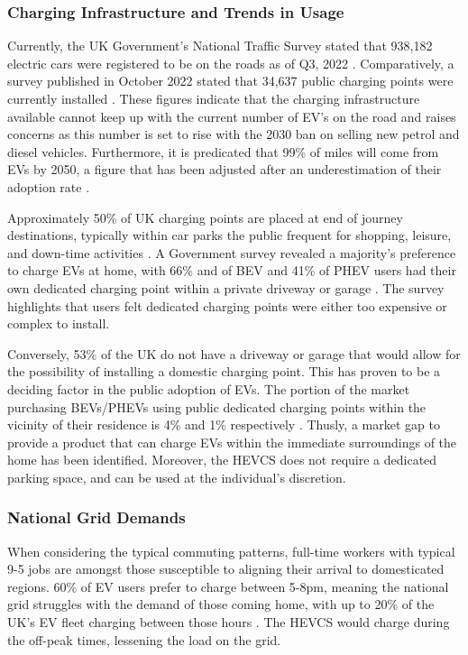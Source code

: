 \documentclass [12pt]{article}
\begin{document}
\subsubsection{Charging Infrastructure and Trends in Usage}

Currently, the UK Government’s National Traffic Survey stated that 938,182 electric cars were registered to be on the roads as of Q3, 2022 \cite{Q32022}. Comparatively, a survey published in October 2022 stated that 34,637 public charging points were currently installed \cite{chargestats}. These figures indicate that the charging infrastructure available cannot keep up with the current number of EV’s on the road and raises concerns as this number is set to rise with the 2030 ban on selling new petrol and diesel vehicles. Furthermore, it is predicated that 99\% of miles will come from EVs by 2050, a figure that has been adjusted after an underestimation of their adoption rate \cite{2050rates}. 

Approximately 50\% of UK charging points are placed at end of journey destinations, typically within car parks the public frequent for shopping, leisure, and down-time activities \cite{chargestats}. A Government survey revealed a majority's preference to charge EVs at home, with 66\% and of BEV and 41\% of PHEV users had their own dedicated charging point within a private driveway or garage \cite{homecharge}. The survey highlights that users felt dedicated charging points were either too expensive or complex to install.

Conversely, 53\% of the UK do not have a driveway or garage that would allow for the possibility of installing a domestic charging point. This has proven to be a deciding factor in the public adoption of EVs. The portion of the market purchasing BEVs/PHEVs using public dedicated charging points within the vicinity of their residence is 4\% and 1\% respectively \cite{chargestats}. Thusly, a market gap to provide a product that can charge EVs within the immediate surroundings of the home has been identified. Moreover, the HEVCS does not require a dedicated parking space, and can be used at the individual's discretion. 

\subsubsection{National Grid Demands}

When considering the typical commuting patterns, full-time workers with typical 9-5 jobs are amongst those susceptible to aligning their arrival to domesticated regions. 60\% of EV users prefer to charge between 5-8pm, meaning the national grid struggles with the demand of those coming home, with up to 20\% of the UK's EV fleet charging between those hours \cite{chargestats}. The HEVCS would charge during the off-peak times, lessening the load on the grid.
\end{document}
